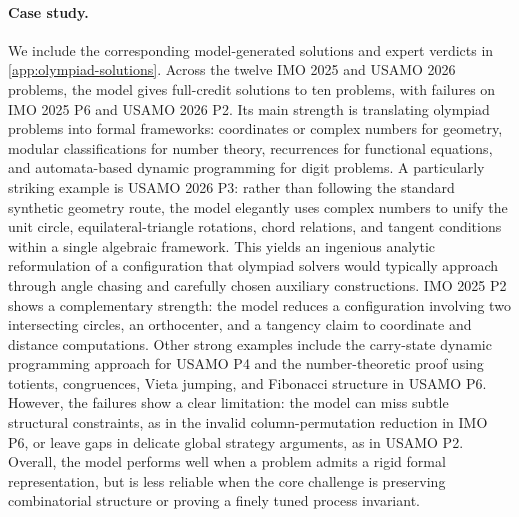 \paragraph{Case study.} 
We include the corresponding
model-generated solutions and expert verdicts in
\cref{app:olympiad-solutions}. 
Across the twelve IMO 2025 and USAMO 2026 problems, the model gives full-credit solutions to ten problems, with failures on IMO 2025 P6 and USAMO 2026 P2. Its main strength is translating olympiad problems into formal frameworks: coordinates or complex numbers for geometry, modular classifications for number theory, recurrences for functional equations, and automata-based dynamic programming for digit problems. A particularly striking example is USAMO 2026 P3: rather than following the standard synthetic geometry route, the model elegantly uses complex numbers to unify the unit circle, equilateral-triangle rotations, chord relations, and tangent conditions within a single algebraic framework. This yields an ingenious analytic reformulation of a configuration that olympiad solvers would typically approach through angle chasing and carefully chosen auxiliary constructions. IMO 2025 P2 shows a complementary strength: the model reduces a configuration involving two intersecting circles, an orthocenter, and a tangency claim to coordinate and distance computations. Other strong examples include the carry-state dynamic programming approach for USAMO P4 and the number-theoretic proof using totients, congruences, Vieta jumping, and Fibonacci structure in USAMO P6. However, the failures show a clear limitation: the model can miss subtle structural constraints, as in the invalid column-permutation reduction in IMO P6, or leave gaps in delicate global strategy arguments, as in USAMO P2. Overall, the model performs well when a problem admits a rigid formal representation, but is less reliable when the core challenge is preserving combinatorial structure or proving a finely tuned process invariant.